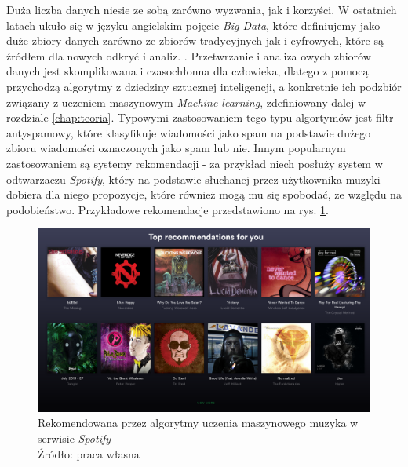 Duża liczba danych niesie ze sobą zarówno wyzwania, jak i korzyści.
W ostatnich latach ukuło się w języku angielskim pojęcie \textit{Big Data}, które definiujemy jako duże zbiory danych zarówno ze zbiorów tradycyjnych jak i cyfrowych, które są źródłem dla nowych odkryć i analiz. \cite{Arthur2013}.
Przetwrzanie i analiza owych zbiorów danych jest skomplikowana i czasochłonna dla człowieka, dlatego z pomocą przychodzą algorytmy z dziedziny sztucznej inteligencji, a konkretnie ich podzbiór związany z uczeniem maszynowym \textit{Machine learning}, zdefiniowany dalej w rozdziale \ref{chap:teoria}.
Typowymi zastosowaniem tego typu algortymów jest filtr antyspamowy, które klasyfikuje wiadomości jako spam na podstawie dużego zbioru wiadomości oznaczonych jako spam lub nie.
Innym popularnym zastosowaniem są systemy rekomendacji - za przykład niech posłuży system w odtwarzaczu \textit{Spotify}, który na podstawie słuchanej przez użytkownika muzyki dobiera dla niego propozycje, które również mogą mu się spobodać, ze względu na podobieństwo.
Przykładowe rekomendacje przedstawiono na rys. \ref{fig:recommendations}.

\begin{figure}[h!tb]
	 \centering
	 \includegraphics[width = 1.0\linewidth]{img/recommendations}
	 \caption{Rekomendowana przez algorytmy uczenia maszynowego muzyka w serwisie \textit{Spotify} \\
              Źródło: praca własna}
	 \label{fig:recommendations}
\end{figure}

